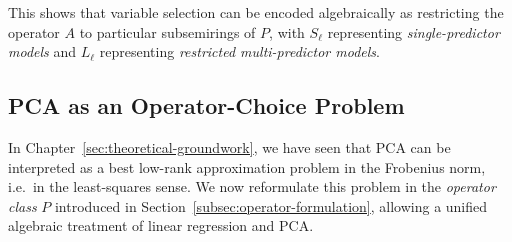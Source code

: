 This shows that variable selection can be encoded algebraically as restricting the operator $A$ to particular subsemirings of $P$, with $S_\ell$ representing \emph{single-predictor models} and $L_\ell$ representing \emph{restricted multi-predictor models}.

\subsection{PCA as an Operator-Choice Problem}
\label{subsec:pca-operator}

In Chapter~\ref{sec:theoretical-groundwork}, we have seen that PCA can be interpreted as a best low-rank approximation problem in the Frobenius norm, i.e.\ in the least-squares sense. We now reformulate this problem in the \emph{operator class} $P$ introduced in Section~\ref{subsec:operator-formulation}, allowing a unified algebraic treatment of linear regression and PCA.

